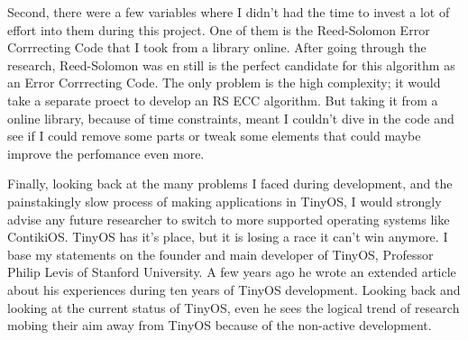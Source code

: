 Second, there were a few variables where I didn't had the time to invest
a lot of effort into them during this project. One of them is the
Reed-Solomon Error Corrrecting Code that I took from a library online.
After going through the research, Reed-Solomon was en still is the
perfect candidate for this algorithm as an Error Corrrecting Code. The
only problem is the high complexity; it would take a separate proect to
develop an RS ECC algorithm. But taking it from a online library,
because of time constraints, meant I couldn't dive in the code and see
if I could remove some parts or tweak some elements that could maybe
improve the perfomance even more.

Finally, looking back at the many problems I faced during development,
and the painstakingly slow process of making applications in TinyOS, I
would strongly advise any future researcher to switch to more supported
operating systems like ContikiOS. TinyOS has it's place, but it is
losing a race it can't win anymore. I base my statements on the founder
and main developer of TinyOS, Professor Philip Levis of Stanford
University. A few years ago he wrote an extended article about his
experiences during ten years of TinyOS development. Looking back and
looking at the current status of TinyOS, even he sees the logical trend
of research mobing their aim away from TinyOS because of the non-active
development.
